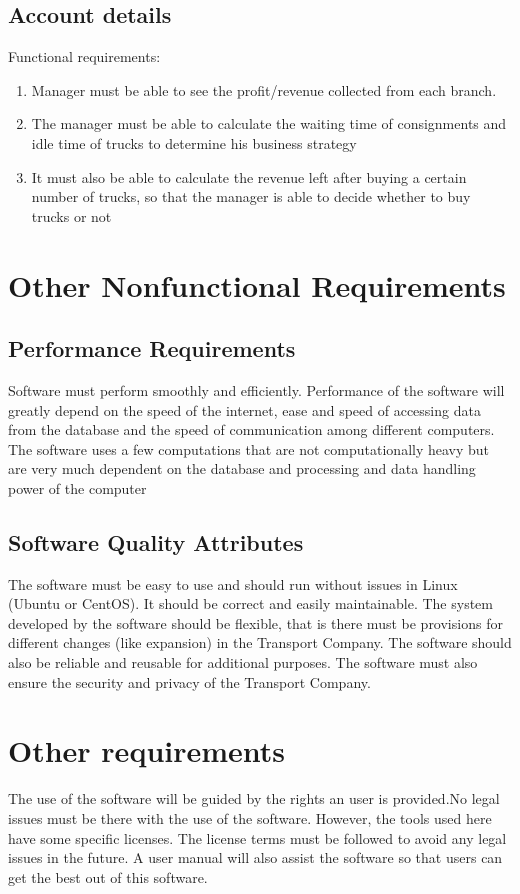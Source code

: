 \documentclass[english,openany,12pt,a4paper,dvipsnames]{book}
\begin{document}
        \subsection{Account details}
        Functional requirements:
            \begin{enumerate}
              \item Manager must be able to see the profit/revenue collected from each branch.
              \item The manager must be able to calculate the waiting time of consignments and idle time of
                    trucks to determine his business strategy
              \item It must also be able to calculate the revenue left after buying a certain number of trucks, so
                    that the manager is able to decide whether to buy trucks or not
            \end{enumerate}
\markboth{}{}

\section{Other Nonfunctional Requirements}
        \subsection{Performance Requirements}
                Software must perform smoothly and efficiently. Performance of the software will greatly depend
                on the speed of the internet, ease and speed of accessing data from the database and the speed of
                communication among different computers. The software uses a few computations that are not
                computationally heavy but are very much dependent on the database and processing and data
                handling power of the computer
        \subsection{Software Quality Attributes}
                The software must be easy to use and should run without issues in Linux (Ubuntu or CentOS). It
                should be correct and easily maintainable. The system developed by the software should be flexible,
                that is there must be provisions for different changes (like expansion) in the Transport Company.
                The software should also be reliable and reusable for additional purposes. The software must also
                ensure the security and privacy of the Transport Company.
\markboth{}{}

\section{Other requirements}
        The use of the software will be guided by the rights an user is provided.No legal issues must be
        there with the use of the software. However, the tools used here have some specific licenses. The
        license terms must be followed to avoid any legal issues in the future. A user manual will also assist
        the software so that users can get the best out of this software.
\end{document}
